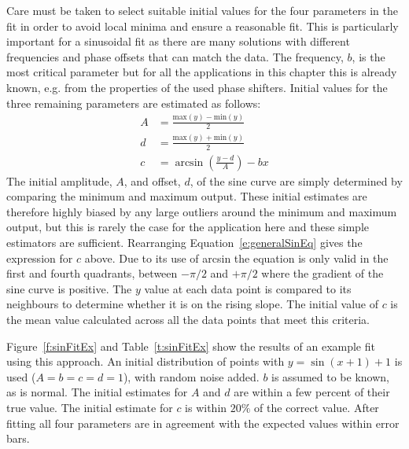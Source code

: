 Care must be taken to select suitable initial values for the four parameters in the fit in order to avoid local minima and ensure a reasonable fit. This is particularly important for a sinusoidal fit as there are many solutions with different frequencies and phase offsets that can match the data. The frequency, \(b\), is the most critical parameter but for all the applications in this chapter this is already known, e.g. from the properties of the used phase shifters. Initial values for the three remaining parameters are estimated as follows:
\begin{align}
A &= \frac{\mathrm{max}(y)-\mathrm{min}(y)}{2} \\
d &= \frac{\mathrm{max}(y)+\mathrm{min}(y)}{2} \\
c &= \arcsin\left(\frac{y-d}{A}\right) - bx
\end{align}
The initial amplitude, \(A\), and offset, \(d\), of the sine curve are simply determined by comparing the minimum and maximum output. These initial estimates are therefore highly biased by any large outliers around the minimum and maximum output, but this is rarely the case for the application here and these simple estimators are sufficient.
Rearranging Equation~\ref{e:generalSinEq} gives the expression for \(c\) above. Due to its use of arcsin the equation is only valid in the first and fourth quadrants, between \(-\pi/2\) and \(+\pi/2\) where the gradient of the sine curve is positive. The \(y\) value at each data point is compared to its neighbours to determine whether it is on the rising slope. The initial value of \(c\) is the mean value calculated across all the data points that meet this criteria.

Figure~\ref{f:sinFitEx} and Table~\ref{t:sinFitEx} show the results of an example fit using this approach. An initial distribution of points with \(y=\sin(x+1)+1\) is used (\(A = b = c = d = 1\)), with random noise added. \(b\) is assumed to be known, as is normal. The initial estimates for \(A\) and \(d\) are within a few percent of their true value. The initial estimate for \(c\) is within \(20\%\) of the correct value. After fitting all four parameters are in agreement with the expected values within error bars.

